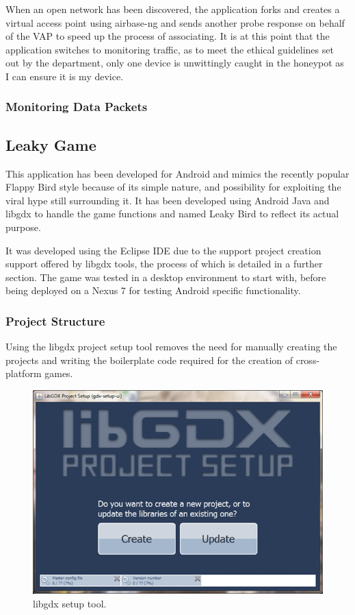 When an open network has been discovered, the application forks and creates a virtual access point using airbase-ng and sends another probe response on behalf of the VAP to speed up the process of associating. It is at this point that the application switches to monitoring traffic, as to meet the ethical guidelines set out by the department, only one device is unwittingly caught in the honeypot as I can ensure it is my device.

\subsubsection{Monitoring Data Packets}

\subsection{Leaky Game}
This application has been developed for Android and mimics the recently popular Flappy Bird style because of its simple nature, and possibility for exploiting the viral hype still surrounding it. It has been developed using Android Java and libgdx to handle the game functions and named Leaky Bird to reflect its actual purpose.

It was developed using the Eclipse IDE due to the support project creation support offered by libgdx tools, the process of which is detailed in a further section. The game was tested in a desktop environment to start with, before being deployed on a Nexus 7 for testing Android specific functionality.
\clearpage
\subsubsection{Project Structure}
Using the libgdx project setup tool removes the need for manually creating the projects and writing the boilerplate code required for the creation of cross-platform games. 

\begin{figure}[h!]
\centering\includegraphics[width=\linewidth]{implementation/figures/gdx-setup-1.png}
\caption{libgdx setup tool.}
\end{figure}

